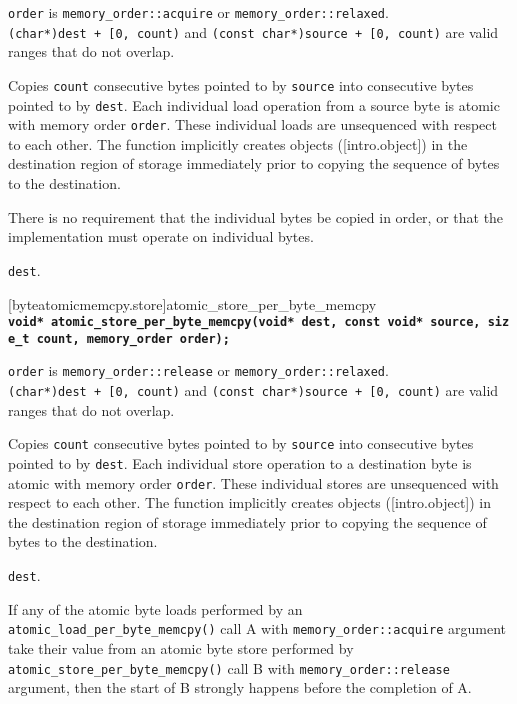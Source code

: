 \begin{itemdescr}
\pnum
\expects

\texttt{order} is \texttt{memory\_order::acquire} or
\texttt{memory\_order::relaxed}. \texttt{(char*)dest\ +\ {[}0,\ count)}
and \texttt{(const\ char*)source\ +\ {[}0,\ count)} are valid ranges
that do not overlap.

\pnum
\effects
Copies \texttt{count} consecutive bytes pointed to by
\texttt{source} into consecutive bytes pointed to by \texttt{dest}. Each
individual load operation from a source byte is atomic with memory order
\texttt{order}. These individual loads are unsequenced with respect to
each other. The function implicitly creates objects ({[}intro.object{]})
in the destination region of storage immediately prior to copying the
sequence of bytes to the destination. 
\begin{note} There is no requirement
that the individual bytes be copied in order, or that the implementation
must operate on individual bytes. \end{note}

\pnum
\returns
\texttt{dest}.
\end{itemdescr}

[byteatomicmemcpy.store]{atomic_store_per_byte_memcpy}
\textbf{\texttt{void*\ atomic\_store\_per\_byte\_memcpy(void*\ dest,\ const\ void*\ source,\ size\_t\ count,\ memory\_order\ order);}}

\begin{itemdescr}
\pnum
\expects
\texttt{order} is \texttt{memory\_order::release} or
\texttt{memory\_order::relaxed}. \texttt{(char*)dest\ +\ {[}0,\ count)}
and \texttt{(const\ char*)source\ +\ {[}0,\ count)} are valid ranges
that do not overlap.

\pnum
\effects
Copies \texttt{count} consecutive bytes pointed to by
\texttt{source} into consecutive bytes pointed to by \texttt{dest}. Each
individual store operation to a destination byte is atomic with memory
order \texttt{order}. These individual stores are unsequenced with
respect to each other. The function implicitly creates objects
({[}intro.object{]}) in the destination region of storage immediately
prior to copying the sequence of bytes to the destination.

\pnum
\returns

\texttt{dest}.
\end{itemdescr}

\begin{note} If any of the atomic byte loads performed by an
\texttt{atomic\_load\_per\_byte\_memcpy()} call A with
\texttt{memory\_order::acquire} argument take their value from an atomic
byte store performed by \texttt{atomic\_store\_per\_byte\_memcpy()} call
B with \texttt{memory\_order::release} argument, then the start of B
strongly happens before the completion of A. 
\end{note}  
